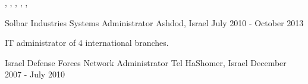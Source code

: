 \begin{cventries}
    \begin{cvskills}
       {, }
       {, ,  , , }
    \end{cvskills}
    
  \cventry
    {Solbar Industries}
    {Systems Administrator}
    {Ashdod, Israel}
    {July 2010 - October 2013}
    {
      \begin{cvitems}
        \item {IT administrator of 4 international branches.}
      \end{cvitems}
    }
    \vspace{3.0mm}

  \cventry
    {Israel Defense Forces}
    {Network Administrator}
    {Tel HaShomer, Israel}
    {December 2007 - July 2010}
    {}
    \vspace{-5.0mm}

\end{cventries}

